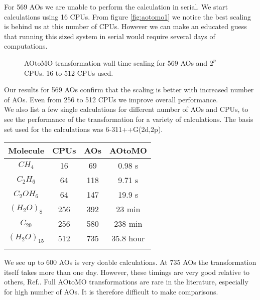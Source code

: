 For 569 AOs we are unable to perform the calculation in serial. We start calculations using 16 CPUs. From figure \ref{fig:aotomo1} we notice the best scaling is behind us at this number of CPUs. However we can make an educated guess that running this sized system in serial would require several days of computations. \\

\begin{figure}[h!]
\begin{center}
\caption{AOtoMO transformation wall time scaling for 569 AOs and $2^p$ CPUs. 16 to 512 CPUs used. }
\label{fig:aotomo2}
\end{center}
\end{figure}

Our results for 569 AOs confirm that the scaling is better with increased number of AOs. Even from 256 to 512 CPUs we improve overall performance.  \\ 

We also list a few single calculations for different number of AOs and CPUs, to see the performance of the transformation for a variety of calculations. The basis set used for the calculations was 6-311++G(2d,2p). \\

  \begin{center}
  \begin{tabular}{ c c c c }
  \hline
     Molecule & CPUs & AOs & AOtoMO \\ \hline
     $CH_4$ & 16 & 69 & 0.98 s \\
     $C_2H_6$ & 64 & 118 & 9.71 s \\
     $C_2 O H_6$ & 64 & 147 & 19.9 s \\
     $\left(H_2O\right)_8$ & 256 & 392 & 23 min \\
     $C_{20}$ & 256 & 580 & 238 min \\
     $\left(H_2O\right)_{15}$ & 512 & 735 & 35.8 hour \\
     \hline \\
  \end{tabular} 
\end{center} 

We see up to 600 AOs is very doable calculations. At 735 AOs the transformation itself takes more than one day. However, these timings are very good relative to others, Ref.\cite{aotomo_2_cite}. Full AOtoMO transformations are rare in the literature, especially for high number of AOs. It is therefore difficult to make comparisons. \\ 

